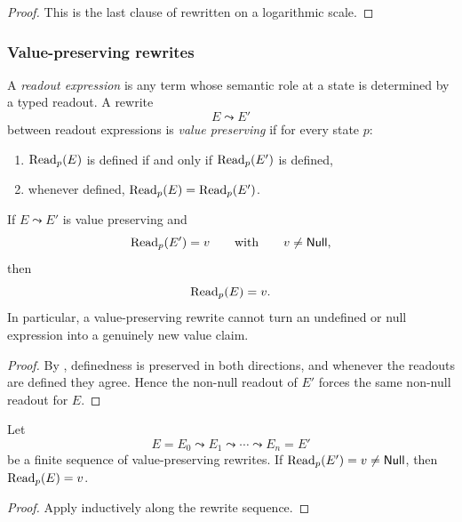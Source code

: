 \begin{proof}
This is the last clause of  rewritten on a logarithmic scale.
\end{proof}

\subsubsection{Value-preserving rewrites}

\begin{definition}\label{def:value-preserving-rewrite}
A \emph{readout expression} is any term whose semantic role at a state is determined by a typed readout. A rewrite
\[
E\leadsto E'
\]
between readout expressions is \emph{value preserving} if for every state $p$:
\begin{enumerate}[label=(\roman*),nosep]
\item $\mathrm{Read}_p(E)$ is defined if and only if $\mathrm{Read}_p(E')$ is defined,
\item whenever defined, $\mathrm{Read}_p(E)=\mathrm{Read}_p(E')$.
\end{enumerate}
\end{definition}

\begin{proposition}\label{prop:value-preserving-no-creation}
If $E\leadsto E'$ is value preserving and
\[
\mathrm{Read}_p(E')=v
\qquad\text{with}\qquad
v\neq \mathsf{Null},
\]
then
\[
\mathrm{Read}_p(E)=v.
\]
In particular, a value-preserving rewrite cannot turn an undefined or null expression into a genuinely new value claim.
\end{proposition}

\begin{proof}
By , definedness is preserved in both directions, and whenever the readouts are defined they agree. Hence the non-null readout of $E'$ forces the same non-null readout for $E$.
\end{proof}

\begin{corollary}\label{cor:normalization-no-fact-creation}
Let
\[
E=E_0\leadsto E_1\leadsto\cdots\leadsto E_n=E'
\]
be a finite sequence of value-preserving rewrites. If $\mathrm{Read}_p(E')=v\neq \mathsf{Null}$, then $\mathrm{Read}_p(E)=v$.
\end{corollary}

\begin{proof}
Apply  inductively along the rewrite sequence.
\end{proof}

